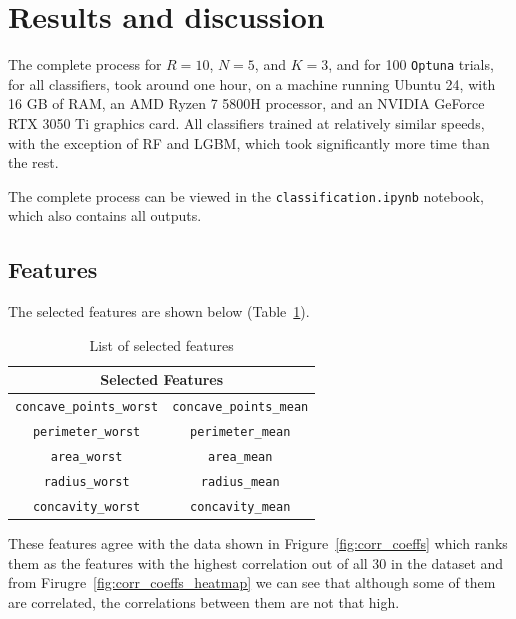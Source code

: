 \documentclass[12pt]{article}
\begin{document}
\section{Results and discussion}

The complete process for $R=10$, $N=5$, and $K=3$, and for 100 \texttt{Optuna}
trials, for all classifiers, took around one hour, on a machine running Ubuntu
24, with 16 GB of RAM, an AMD Ryzen 7 5800H processor, and an NVIDIA GeForce RTX
3050 Ti graphics card. All classifiers trained at relatively similar speeds,
with the exception of RF and LGBM, which took significantly more time than the
rest.

The complete process can be viewed in the \texttt{classification.ipynb} notebook,
which also contains all outputs.


\subsection{Features}

The selected features are shown below
(Table~\ref{tab:features}).
\begin{table}[H]
    \centering
    \begin{tabular}{|c|c|}
    \hline
    \multicolumn{2}{|c|}{\textbf{Selected Features}} \\
    \hline
    \texttt{concave\_points\_worst} & \texttt{concave\_points\_mean} \\
    \hline
    \texttt{perimeter\_worst}       & \texttt{perimeter\_mean} \\
    \hline
    \texttt{area\_worst}            & \texttt{area\_mean} \\
    \hline
    \texttt{radius\_worst}          & \texttt{radius\_mean} \\
    \hline
    \texttt{concavity\_worst}       & \texttt{concavity\_mean} \\
    \hline
    \end{tabular}
    \caption{List of selected features}
    \label{tab:features}
\end{table}

These features agree with the data shown in Frigure~\ref{fig:corr_coeffs} which
ranks them as the features with the highest correlation out of all 30 in the
dataset and from Firugre~\ref{fig:corr_coeffs_heatmap} we can see that although
some of them are correlated, the correlations between them are not that high.
\end{document}

